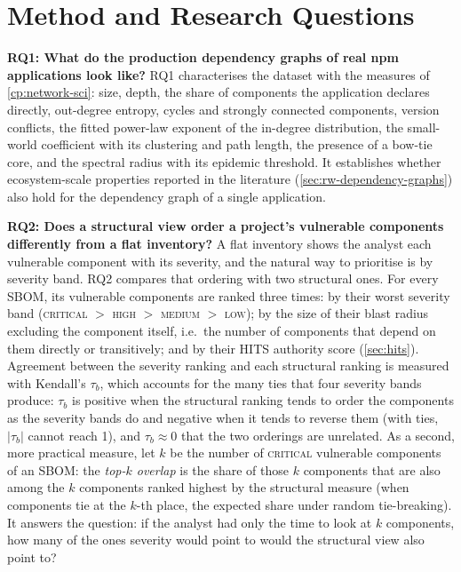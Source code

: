 \section{Method and Research Questions}
\label{sec:eval-method}

\textbf{RQ1: What do the production dependency graphs of real npm applications look like?} RQ1 characterises the dataset with the measures of \autoref{cp:network-sci}: size, depth, the share of components the application declares directly, out-degree entropy, cycles and strongly connected components, version conflicts, the fitted power-law exponent of the in-degree distribution, the small-world coefficient with its clustering and path length, the presence of a bow-tie core, and the spectral radius with its epidemic threshold. It establishes whether ecosystem-scale properties reported in the literature (\autoref{sec:rw-dependency-graphs}) also hold for the dependency graph of a single application.

\textbf{RQ2: Does a structural view order a project's vulnerable components differently from a flat inventory?} A flat inventory shows the analyst each vulnerable component with its severity, and the natural way to prioritise is by severity band. RQ2 compares that ordering with two structural ones. For every SBOM, its vulnerable components are ranked three times: by their worst severity band (\textsc{critical} \(>\) \textsc{high} \(>\) \textsc{medium} \(>\) \textsc{low}); by the size of their blast radius excluding the component itself, i.e.\ the number of components that depend on them directly or transitively; and by their HITS authority score (\autoref{sec:hits}). Agreement between the severity ranking and each structural ranking is measured with Kendall's \(\tau_b\), which accounts for the many ties that four severity bands produce: \(\tau_b\) \citep{Kendall1938, Kendall1945} is positive when the structural ranking tends to order the components as the severity bands do and negative when it tends to reverse them (with ties, \(|\tau_b|\) cannot reach 1), and \(\tau_b \approx 0\) that the two orderings are unrelated. As a second, more practical measure, let \(k\) be the number of \textsc{critical} vulnerable components of an SBOM: the \textit{top-\(k\) overlap} is the share of those \(k\) components that are also among the \(k\) components ranked highest by the structural measure (when components tie at the \(k\)-th place, the expected share under random tie-breaking). It answers the question: if the analyst had only the time to look at \(k\) components, how many of the ones severity would point to would the structural view also point to?


